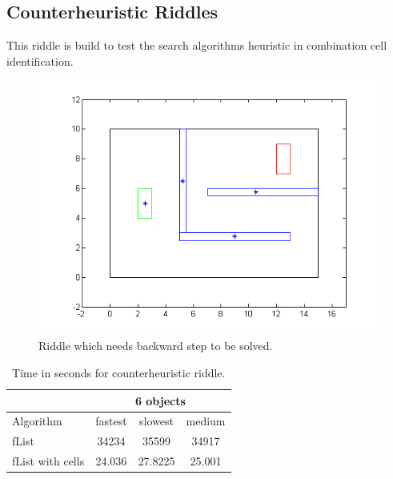 \subsection{Counterheuristic Riddles}
\label{subsec:counterheuristic}
This riddle is build to test the search algorithms heuristic in combination cell identification.\\
\begin{figure}[H]
\centering
\includegraphics[scale = 0.5]{riddleB}
\caption{Riddle which needs backward step to be solved.}
\end{figure}
\begin{table}[H]
\centering
\begin{tabular}{l||c|c|c}
& \multicolumn{3}{c||}{6 objects} \\\hline\hline
Algorithm& fastest & slowest & medium \\\hline
fList  &  34234 &  35599 & 34917 \\
fList with cells & 24.036 & 27.8225 & 25.001 \\
\end{tabular}
\caption{Time in seconds for counterheuristic riddle.}
\end{table}




